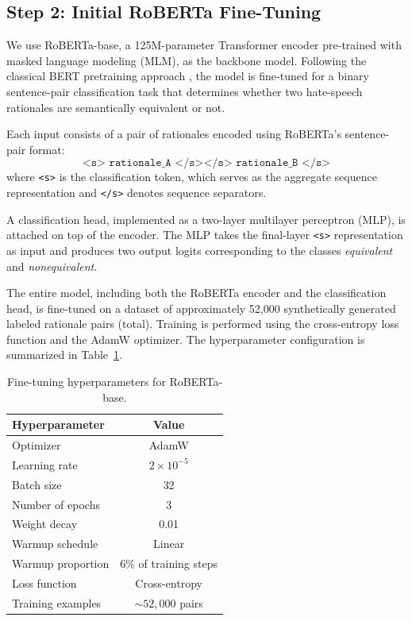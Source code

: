 \documentclass[10pt,conference,compsocconf]{IEEEtran}
\begin{document}
\subsection{Step 2: Initial RoBERTa Fine-Tuning}

We use RoBERTa-base, a 125M-parameter Transformer encoder pre-trained with masked language modeling (MLM), as the backbone model. Following the classical BERT pretraining approach \cite{liu2019roberta}, the model is fine-tuned for a binary sentence-pair classification task that determines whether two hate-speech rationales are semantically equivalent or not.

Each input consists of a pair of rationales encoded using RoBERTa's sentence-pair format:
\[
\texttt{<s> rationale\_A </s></s> rationale\_B </s>}
\]
where \texttt{<s>} is the classification token, which serves as the aggregate sequence representation and \texttt{</s>} denotes sequence separators.

A classification head, implemented as a two-layer multilayer perceptron (MLP), is attached on top of the encoder. The MLP takes the final-layer \texttt{<s>} representation as input and produces two output logits corresponding to the classes \textit{equivalent} and \textit{nonequivalent}.

The entire model, including both the RoBERTa encoder and the classification head, is fine-tuned on a dataset of approximately 52,000 synthetically generated labeled rationale pairs (total). Training is performed using the cross-entropy loss function and the AdamW optimizer. The hyperparameter configuration is summarized in Table~\ref{tab:roberta_hyperparameters}. 

\begin{table}[h]
\centering
\caption{Fine-tuning hyperparameters for RoBERTa-base.}
\label{tab:roberta_hyperparameters}
\begin{tabular}{lc}
\hline
\textbf{Hyperparameter} & \textbf{Value} \\
\hline
Optimizer & AdamW \\
Learning rate & $2 \times 10^{-5}$ \\
Batch size & 32 \\
Number of epochs & 3 \\
Weight decay & 0.01 \\
Warmup schedule & Linear \\
Warmup proportion & 6\% of training steps \\
Loss function & Cross-entropy \\
Training examples & $\sim 52{,}000$ pairs \\
\hline
\end{tabular}
\end{table}
\end{document}
